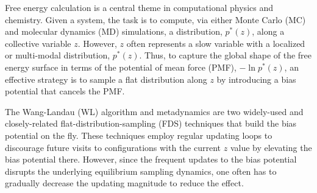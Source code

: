 \documentclass[reprint, floatfix]{revtex4-1}
\begin{document}
Free energy calculation\cite{frenkel, newman} is a central theme
in computational physics and chemistry.
%
Given a system,
the task is to compute,
via either Monte Carlo\cite{frenkel, newman, landau_binder} (MC)
and molecular dynamics\cite{frenkel, karplus2002} (MD) simulations,
a distribution, $p^*(z)$,
along a collective variable $z$.
%
However, $z$
often represents a slow variable
with a localized or multi-modal distribution, $p^*(z)$.
%
Thus,
to capture the global shape of the free energy surface
in terms of the potential of mean force (PMF), $-\ln p^*(z)$,
an effective strategy is to sample a flat distribution
along $z$ by introducing a bias potential that
cancels the PMF.
%
%
%



The Wang-Landau (WL) algorithm\cite{wang2001, wang2001pre}
and meta\-dy\-nam\-ics\cite{huber1994, laio2002,
laio2008, barducci2011, sutto2012}
are two widely-used and closely-related\cite{micheletti2004}
flat-distribution-sampling (FDS) techniques
that build the bias potential on the fly.
%
These techniques employ regular updating loops
to discourage future visits to configurations
with the current $z$ value
by elevating the bias potential there.
%
%
However,
since the frequent updates to the bias potential
disrupts the underlying
equilibrium sampling dynamics\cite{laio2002},
one often has to gradually decrease
the updating magnitude
to reduce the effect.
\end{document}
